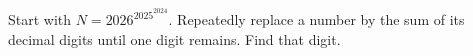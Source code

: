 Start with $N=2026^{2025^{2024}}$. Repeatedly replace a number by the sum of its decimal digits until one digit remains. Find that digit.
